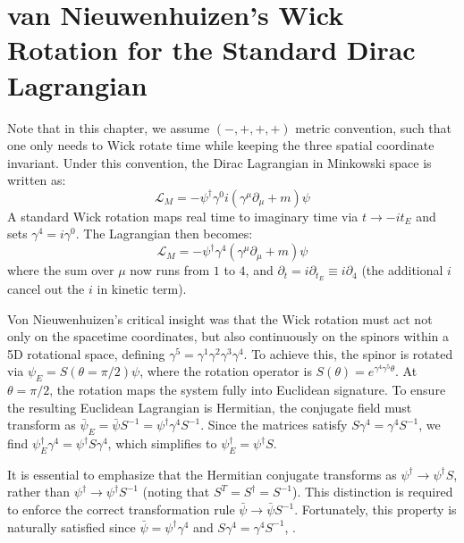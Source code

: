 \section{van Nieuwenhuizen's Wick Rotation for the Standard Dirac Lagrangian}\label{sec:Nieuwenhuizen_Wick_rotation}

Note that in this chapter, we assume $(-,+,+,+)$ metric convention, such that one only needs to Wick rotate time while keeping the three spatial coordinate invariant. Under this convention, the Dirac Lagrangian in Minkowski space is written as: 
\[
\mathcal{L}_M=-\psi^\dagger \gamma^0 i (\gamma^\mu\partial_\mu +m)\psi
\]
A standard Wick rotation maps real time to imaginary time via $t\to -i t_E$ and sets $\gamma^4=i\gamma^0$. The Lagrangian then becomes:
\[
\mathcal{L}_M=-\psi^\dagger \gamma^4(\gamma^\mu\partial_\mu +m)\psi
\]
where the sum over $\mu$ now runs from $1$ to $4$, and $\partial_t=i\partial_{t_E}\equiv i\partial_4$ (the additional $i$ cancel out the $i$ in kinetic term). 

Von Nieuwenhuizen's critical insight was that the Wick rotation must act not only on the spacetime coordinates, but also continuously on the spinors within a 5D rotational space, defining $\gamma^5=\gamma^1\gamma^2\gamma^3\gamma^4$. To achieve this, the spinor is rotated via $\psi_E =S(\theta=\pi/2)\psi$, where the rotation operator is $S(\theta)=e^{\gamma^4\gamma^5\theta}$. At $\theta=\pi/2$, the rotation maps the system fully into Euclidean signature. To ensure the resulting Euclidean Lagrangian is Hermitian, the conjugate field must transform as $\bar\psi_E =\bar\psi S^{-1}=\psi^\dagger\gamma^4 S^{-1}$. Since the matrices satisfy $S\gamma^4=\gamma^4 S^{-1}$, we find $\psi_E^\dagger \gamma^4 =\psi^\dagger S\gamma^4$, which simplifies to $\psi_E^\dagger=\psi^\dagger S$.

It is essential to emphasize that the Hermitian conjugate transforms as $\psi^\dagger \to \psi^\dagger S$, rather than $\psi^\dagger \to \psi^\dagger S^{-1}$ (noting that $S^T=S^\dagger =S^{-1}$). This distinction is required to enforce the correct transformation rule $\bar\psi\to \bar\psi S^{-1}$. Fortunately, this property is naturally satisfied since $\bar{\psi}=\psi^\dagger\gamma^4$ and $S\gamma^4=\gamma^4 S^{-1}$, .

